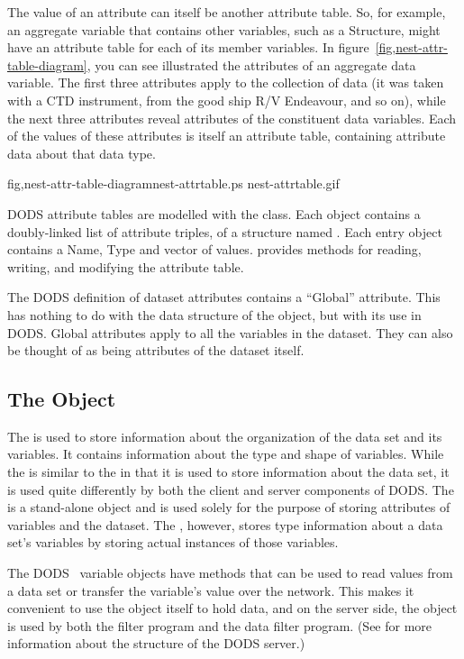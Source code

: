 The value of an attribute can itself be another attribute table.  So,
for example, an aggregate variable that contains other
variables, such as a Structure, might have an attribute table for each
of its member variables.  In figure~\ref{fig,nest-attr-table-diagram},
you can see illustrated the attributes of an aggregate data variable.
The first three attributes apply to the collection of data (it was
taken with a CTD instrument, from the good ship R/V Endeavour, and so
on), while the next three attributes reveal attributes of the
constituent data variables.  Each of the values of these attributes is
itself an attribute table, containing attribute data about that data
type. 

%
{fig,nest-attr-table-diagram}{nest-attrtable.ps}%
{nest-attrtable.gif}{}

DODS attribute tables are modelled with the  class.
Each  object contains a doubly-linked list of
attribute triples, of a structure named . Each entry object
contains a Name, Type and vector of values.  
provides methods for reading, writing, and modifying the attribute
table.

The DODS definition of dataset attributes contains a ``Global''
attribute.  This has nothing to do with the data structure of the
 object, but with its use in DODS.  Global attributes apply
to all the variables in the dataset.  They can also be thought of as
being attributes of the dataset itself.

\pagebreak
{}
\subsection{The  Object}
\label{tk,dds}

The  is used to store information about the organization of
the data set and its variables. It contains information about the type
and shape of variables. While the  is similar to the
 in that it is used to store information about the data
set, it is used quite differently by both the client and
server components of DODS. The  is a stand-alone object and
is used solely for the purpose of storing attributes of variables and
the dataset. The , however, stores type information about
a data set's variables by storing actual instances of those variables.

The DODS \dap\ variable objects have methods that can be used to read
values from a data set or transfer the variable's value over the
network.  This makes it convenient to use the  object
itself to hold data, and on the server side, the  object is
used by both the  filter program and the data filter
program.  (See  for more information about the
structure of the DODS server.)

